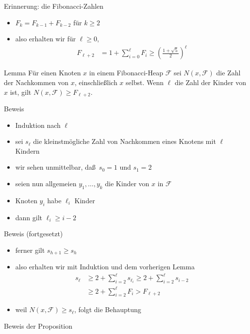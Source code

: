 \documentclass[aspectratio=1610, 11pt]{beamer}
\newcommand\cF{\mathcal F}
\newcommand\bc[1]{\left({#1}\right)}
\newcommand\bcfr[2]{\bc{\frac{#1}{#2}}}
\begin{document}
\begin{frame}
\begin{overprint}
\begin{exampleblock}{Erinnerung: die Fibonacci-Zahlen}
\begin{itemize}
				\item $F_k=F_{k-1}+F_{k-2}$ f\"ur $k\geq2$
				\item also erhalten wir f\"ur $\ell\geq0$,
					\begin{align*}
						F_{\ell+2}&=1+\sum_{i=0}^\ell F_i\geq\bcfr{1+\sqrt 5}2^\ell
					\end{align*}
			\end{itemize}
		\end{exampleblock}
		\begin{block}{Lemma}
			F\"ur einen Knoten $x$ in einem Fibonacci-Heap $\cF$ sei $N(x,\cF)$ die Zahl der Nachkommen von $x$, einschlie\ss lich $x$ selbst. Wenn $\ell$ die Zahl der Kinder von $x$ ist, gilt $ N(x,\cF)\geq F_{\ell+2} $.
		\end{block}
		\begin{exampleblock}{Beweis}
			\begin{itemize}
				\item Induktion nach $\ell$
				\item sei $s_\ell$ die kleinstm\"ogliche Zahl von Nachkommen eines Knotens mit $\ell$ Kindern
				\item wir sehen unmittelbar, da\ss\ $s_0=1$ und $s_1=2$
				\item seien nun allgemeien $y_1,\ldots,y_k$ die Kinder von $x$ in $\cF$
				\item Knoten $y_i$ habe $\ell_i$ Kinder
				\item dann gilt $\ell_i\geq i-2$
			\end{itemize}
		\end{exampleblock}
		\begin{exampleblock}{Beweis (fortgesetzt)}
			\begin{itemize}
				\item ferner gilt $s_{h+1}\geq s_h$
				\item also erhalten wir mit Induktion und dem vorherigen Lemma
					\begin{align*}
						s_\ell&\geq2+\sum_{i=2}^\ell s_{\ell_i}\geq2+\sum_{i=2}^\ell s_{i-2}\\
							  &\geq2+\sum_{i=2}^\ell F_{i}>F_{\ell+2}
					\end{align*}
				\item weil $N(x,\cF)\geq s_\ell$, folgt die Behauptung
			\end{itemize}
		\end{exampleblock}
		\begin{exampleblock}{Beweis der Proposition}

\end{exampleblock}
\end{overprint}
\end{frame}
\end{document}
